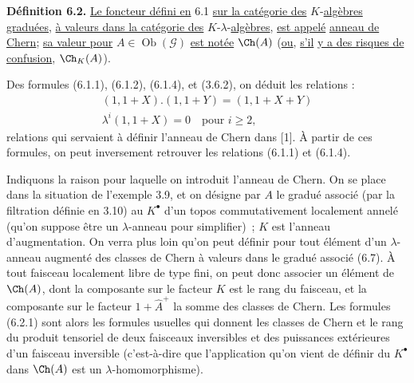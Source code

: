 
\textbf{Définition 6.2.} \uline{Le foncteur défini en} 6.1 \uline{sur la catégorie des} \(K\)-\uline{algèbres} \uline{graduées}, \uline{à valeurs dans la catégorie des} \(K\)-\(\lambda\)-\uline{algèbres}, \uline{est appelé} \uline{anneau de Chern}; \uline{sa valeur pour} \(A\in\operatorname{Ob}(\mathcal G)\) \uline{est notée} \(\Ch(A)\) (\uline{ou}, \uline{s'il} \uline{y a des risques de confusion}, \(\Ch_K(A)\)).

Des formules (6.1.1), (6.1.2), (6.1.4), et (3.6.2), on déduit les relations :
\begin{equation}\tag{6.2.1}
\begin{gathered}
 (1,1+X).(1,1+Y)=(1,1+X+Y)\\
 \lambda^i(1,1+X)=0\quad\text{pour }i\ge2,
\end{gathered}
\end{equation}
relations qui servaient à définir l'anneau de Chern dans [1]. À partir de ces formules, on peut inversement retrouver les relations (6.1.1) et (6.1.4).

Indiquons la raison pour laquelle on introduit l'anneau de Chern. On se place dans la situation de l'exemple 3.9, et on désigne par \(A\) le gradué associé (par la filtration définie en 3.10) au \(K^\bullet\) d'un topos commutativement localement annelé (qu'on suppose être un \(\lambda\)-anneau pour simplifier)~; \(K\) est l'anneau d'augmentation. On verra plus loin qu'on peut définir pour tout élément d'un \(\lambda\)-anneau augmenté des classes de Chern à valeurs dans le gradué associé (6.7). À tout faisceau localement libre de type fini, on peut donc associer un élément de \(\Ch(A)\), dont la composante sur le facteur \(K\) est le rang du faisceau, et la composante sur le facteur \(1+\widehat A^+\) la somme des classes de Chern. Les formules (6.2.1) sont alors les formules usuelles qui donnent les classes de Chern et le rang du produit tensoriel de deux faisceaux inversibles et des puissances extérieures d'un faisceau inversible (c'est-à-dire que l'application qu'on vient de définir du \(K^\bullet\) dans \(\Ch(A)\) est un \(\lambda\)-homomorphisme).

